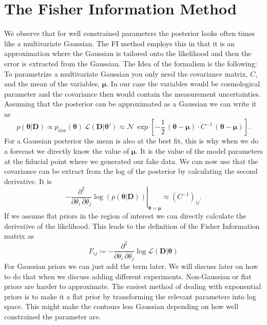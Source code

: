 \documentclass[oneside]{book}
\begin{document}
\section{The Fisher Information Method}
We observe that for well constrained parameters the posterior looks often times like a multivariate Gaussian. The FI method employs this in that it is an approximation where the Gaussian is tailored onto the likelihood and then the error is extracted from the Gaussian. The Idea of the formalism is the following: To parametrize a multivariate Gaussian you only need the covariance matrix, $C$, and the mean of the variables, $\boldsymbol{\mu}$. In our case the variables would be cosmological parameter and the covariance then would contain the measurement uncertainties.\\
Assuming that the posterior can be approximated as a Gaussian we can write it as \begin{equation}
    p(\boldsymbol{\theta}|\boldsymbol{D}) \propto p_\mathrm{rior}(\boldsymbol{\theta})\,\mathcal{L}(\boldsymbol{D}|\boldsymbol{\theta}')\approx \mathcal{N}\,\exp\left[-\frac{1}{2}\,\left(\boldsymbol{\theta}-\boldsymbol{\mu}\right)\cdot C^{-1}\,\left(\boldsymbol{\theta}-\boldsymbol{\mu}\right)\right].
\end{equation}
For a Gaussian posterior the mean is also at the best fit, this is why when we do a forecast we directly know the value of $\boldsymbol{\mu}$. It is the value of the model parameters at the fiducial point where we generated our fake data. We can now use that the covariance can be extract from the log of the posterior by calculating the second derivative. It is \begin{equation}
    \left.-\frac{\partial^2}{\partial \theta_i\,\partial \theta_j}\log(p(\boldsymbol{\theta}|\boldsymbol{D}))\right|_{\boldsymbol{\theta}=\boldsymbol{\mu}}\approx\left(C^{-1}\right)_{ij}. 
\end{equation}
If we assume flat priors in the region of interest we can directly calculate the derivative of the likelihood. This leads to the definition of the Fisher Information matrix as \begin{equation}
    F_{ij}\coloneqq -\frac{\partial^2}{\partial \theta_i\,\partial \theta_j}\log\mathcal{L}(\boldsymbol{D}|\boldsymbol{\theta})
\end{equation}
For Gaussian priors we can just add the term later. We will discuss later on how to do that when we discuss adding different experiments. Non-Gaussian or flat priors are harder to approximate. The easiest method of dealing with exponential priors is to make it a flat prior by transforming the relevant parameters into log space. This might make the contours less Gaussian depending on how well constrained the parameter are.\\
\end{document}
